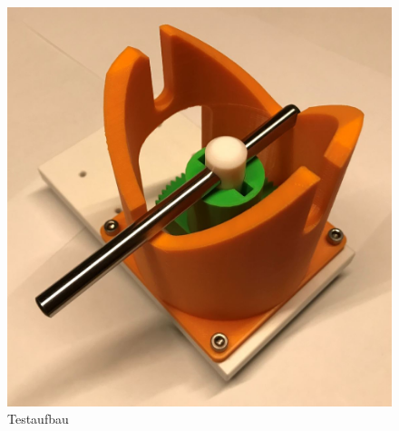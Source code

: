 \documentclass[../../main.tex]{subfiles}
\begin{document}
        \begin{figure}[H]
            \centering
            \includegraphics[width=1.0\textwidth]{../../images/Kran/Testaufbau.JPG}
            \caption {Testaufbau}
            \label{fig:et_komponenten}
        \end{figure}
        \pagebreak
\end{document}
